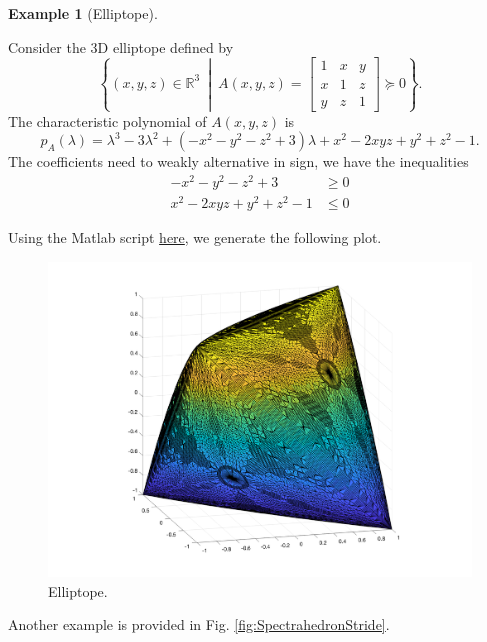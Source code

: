 \documentclass[
]{book}
\theoremstyle{definition}
\theoremstyle{definition}
\newtheorem{example}{Example}[chapter]
\theoremstyle{definition}
\theoremstyle{definition}
\theoremstyle{remark}
\begin{document}
\begin{example}[Elliptope]
\protect\hypertarget{exm:Elliptope}{}\label{exm:Elliptope}

Consider the 3D elliptope defined by
\[
 \left\{ (x,y,z) \in \mathbb{R}^{3} \ \middle\vert\ A(x,y,z) = \begin{bmatrix} 1 & x & y \\ x & 1 & z \\ y & z & 1 \end{bmatrix} \succeq 0 \right\} .
\]
The characteristic polynomial of \(A(x,y,z)\) is
\[
p_A(\lambda) = \lambda^3 - 3 \lambda^2 + (-x^2 - y^2 - z^2 + 3) \lambda + x^2 - 2 xyz + y^2 + z^2 -1. 
\]
The coefficients need to weakly alternative in sign, we have the inequalities
\begin{equation}
\begin{split}
-x^2 - y^2 - z^2 + 3 & \geq 0 \\
x^2 - 2 xyz + y^2 + z^2 -1 & \leq 0
\end{split}
\end{equation}

Using the Matlab script \href{https://github.com/ComputationalRobotics/Semidefinite-Examples/blob/main/elliptope.m}{here}, we generate the following plot.

\begin{figure}

{\centering \includegraphics[width=0.8\linewidth]{images/elliptope} 

}

\caption{Elliptope.}\label{fig:Elliptope}
\end{figure}

\end{example}

Another example is provided in Fig. \ref{fig:SpectrahedronStride}.
\end{document}
